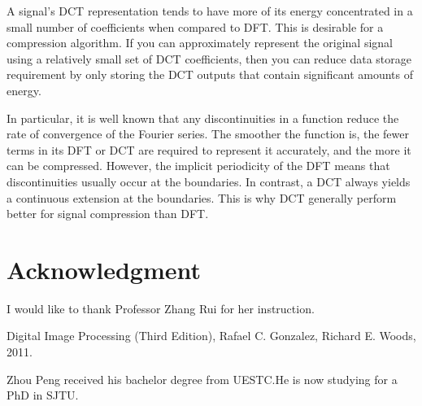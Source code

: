 \documentclass[journal,comsoc]{IEEEtran}
\begin{document}
A signal's DCT representation tends to have more of its energy concentrated in a small number of coefficients
when compared to DFT. This is desirable for a compression algorithm. If you can approximately represent the original
signal using a relatively small set of DCT coefficients, then you can reduce data storage requirement by only storing
the DCT outputs that contain significant amounts of energy.

In particular, it is well known that any discontinuities in a function reduce the rate of convergence of the Fourier series.
The smoother the function is, the fewer terms in its DFT or DCT are required to represent it accurately,
and the more it can be compressed. However, the implicit periodicity of the DFT means that discontinuities usually
occur at the boundaries. In contrast, a DCT always yields a continuous extension at the boundaries.
This is why DCT generally perform better for signal compression than DFT.

\section*{Acknowledgment}
I would like to thank Professor Zhang Rui for her instruction.

\begin{thebibliography}{1}
Digital Image Processing (Third Edition), Rafael C. Gonzalez, Richard E. Woods, 2011.
\end{thebibliography}


\begin{IEEEbiography}{Zhou Peng}
received his bachelor degree from UESTC.He is now studying for a PhD in SJTU.
\end{IEEEbiography}




\vfill
\end{document}
